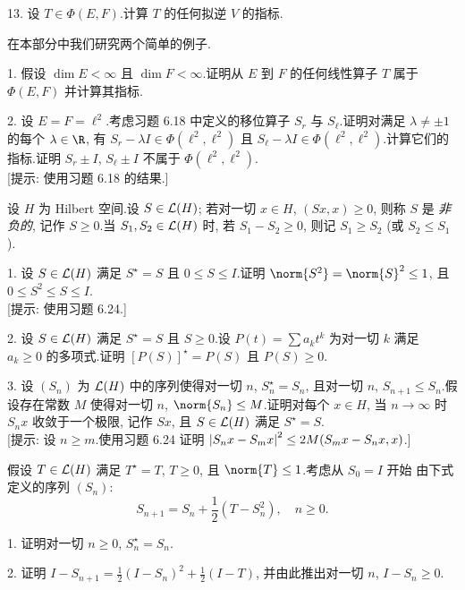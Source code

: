 \begin{problem}[第 2, 6, 11 章]
13. 设 $T\in\Phi(E,F)$.计算 $T$ 的任何拟逆 $V$ 的指标.


在本部分中我们研究两个简单的例子.

1. 假设 $\dim E<\infty$ 且 $\dim F<\infty$.证明从 $E$ 到 $F$ 的任何线性算子 $T$
属于 $\Phi(E,F)$ 并计算其指标.

2. 设 $E=F=\ell^2$.考虑习题 6.18 中定义的移位算子 $S_r$ 与 $S_\ell$.证明对满足
$\lambda\ne\pm1$ 的每个 $\lambda\in\R$, 有 $S_r-\lambda I\in\Phi(\ell^2,\ell^2)$
且 $S_\ell-\lambda I\in\Phi(\ell^2,\ell^2)$.计算它们的指标.证明 $S_r\pm I$,
$S_\ell\pm I$ 不属于 $\Phi(\ell^2,\ell^2)$.\\
{[提示: 使用习题 6.18 的结果.]}
\end{problem}

\begin{problem}[第 5, 6 章]
\label{prob:39}
设 $H$ 为 Hilbert 空间.设 $S\in\mathcal{L}(H)$; 若对一切 $x\in H$, $(Sx,x)\ge0$, 则称 $S$ 是
\emph{非负的}, 记作 $S\ge0$.当 $S_1,S_2\in\mathcal{L}(H)$ 时, 若 $S_1-S_2\ge0$, 则记
$S_1\ge S_2$ (或 $S_2\le S_1$).


1. 设 $S\in\mathcal{L}(H)$ 满足 $S^\star=S$ 且 $0\le S\le I$.证明 $\norm{S^2}=\norm{S}^2\le1$,
且 $0\le S^2\le S\le I$.\\
{[提示: 使用习题 6.24.]}

2. 设 $S\in\mathcal{L}(H)$ 满足 $S^\star=S$ 且 $S\ge0$.设 $P(t)=\sum a_kt^k$ 为对一切 $k$
满足 $a_k\ge0$ 的多项式.证明 $[P(S)]^\star=P(S)$ 且 $P(S)\ge0$.

3. 设 $(S_n)$ 为 $\mathcal{L}(H)$ 中的序列使得对一切 $n$, $S_n^\star=S_n$, 且对一切 $n$,
$S_{n+1}\le S_n$.假设存在常数 $M$ 使得对一切 $n$, $\norm{S_n}\le M$.证明对每个
$x\in H$, 当 $n\to\infty$ 时 $S_nx$ 收敛于一个极限, 记作 $Sx$, 且 $S\in\mathcal{L}(H)$
满足 $S^\star=S$.\\
{[提示: 设 $n\ge m$.使用习题 6.24 证明 $\left|S_nx-S_mx\right|^2\le2M(S_mx-S_nx,x)$.]}


假设 $T\in\mathcal{L}(H)$ 满足 $T^\star=T$, $T\ge0$, 且 $\norm{T}\le1$.考虑从 $S_0=I$ 开始
由下式定义的序列 $(S_n)$:
\begin{equation*}
S_{n+1}=S_n+\frac12(T-S_n^2),\quad n\ge0.
\end{equation*}

1. 证明对一切 $n\ge0$, $S_n^\star=S_n$.

2. 证明 $I-S_{n+1}=\frac12(I-S_n)^2+\frac12(I-T)$, 并由此推出对一切 $n$, $I-S_n\ge0$.


\end{problem}
